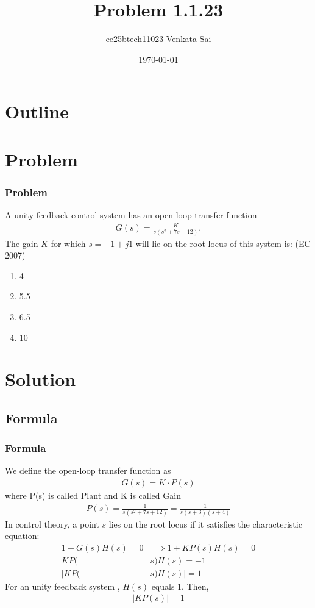 \documentclass{beamer}
\title{Problem 1.1.23}
\author{ee25btech11023-Venkata Sai}
\date{\today}
\theoremstyle{remark}
\numberwithin{equation}{section}
\begin{document}
\begin{frame}
\titlepage
\end{frame}

\section*{Outline}
\begin{frame}
\tableofcontents
\end{frame}

\section{Problem}

\begin{frame}
\frametitle{Problem}
A unity feedback control system has an open-loop transfer function 
\begin{align}
G(s) = \frac{K}{s(s^2 + 7s + 12)}.
\end{align}
The gain $K$ for which $s = -1 + j1$ will lie on the root locus of this system is: \hfill(EC 2007)


\begin{enumerate}
    \item 4 
    \item 5.5
    \item 6.5
    \item 10 
\end{enumerate}
\end{frame}
\section{Solution}

\subsection{Formula}
\setcounter{section}{1}
\begin{frame}
\frametitle{Formula}
We define the open-loop transfer function as
\begin{align}
    G(s) = K \cdot P(s)
\end{align}
where P(s) is called Plant and K is called Gain
\begin{align}
    P(s) = \frac{1}{s(s^2 + 7s + 12)}=\frac{1}{s(s+3)(s+4)}
\end{align}
In control theory, a point $s$ lies on the root locus if it satisfies the characteristic equation:
\begin{align}
1 + G(s)H(s) = 0 &\implies 1 + KP(s)H(s) = 0\\
KP(&s)H(s)=-1 \\
|KP(&s)H(s)| = 1  
\end{align}
For an unity feedback system , $H(s)$ equals 1. Then,
\begin{align}
    |KP(s)| = 1  
\end{align}

\end{frame}
\end{document}
